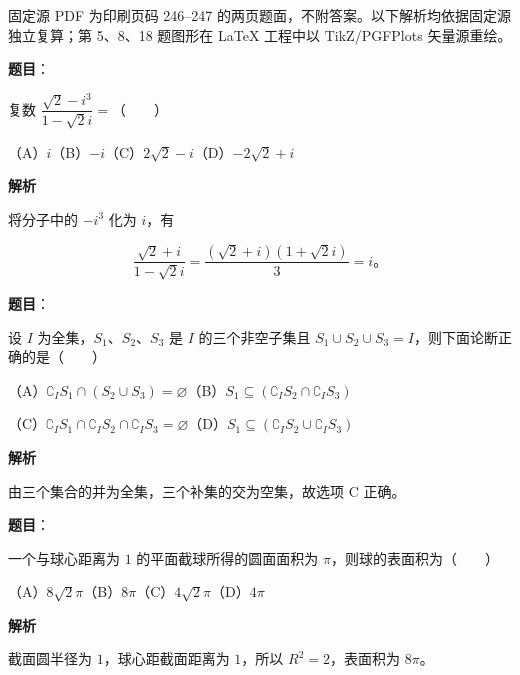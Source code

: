 

\begin{gktip}
固定源 PDF 为印刷页码 246–247 的两页题面，不附答案。以下解析均依据固定源独立复算；第 5、8、18 题图形在 LaTeX 工程中以 TikZ/PGFPlots 矢量源重绘。
\end{gktip}

\begin{answer}

\textbf{题目}：

复数 $\dfrac{\sqrt2-i^3}{1-\sqrt2i}=$\mbox{（　　）}

（A）$i$\quad（B）$-i$\quad（C）$2\sqrt2-i$\quad（D）$-2\sqrt2+i$

\textbf{解析}

将分子中的 $-i^3$ 化为 $i$，有

\nopagebreak[4]
\[
\frac{\sqrt2+i}{1-\sqrt2i}
=\frac{(\sqrt2+i)(1+\sqrt2i)}3=i\text{。}
\]


\end{answer}
\begin{answer}

\textbf{题目}：

设 $I$ 为全集，$S_1\text{、}S_2\text{、}S_3$ 是 $I$ 的三个非空子集且 $S_1\cup S_2\cup S_3=I$，则下面论断正确的是\mbox{（　　）}

（A）$\complement_I S_1\cap(S_2\cup S_3)=\varnothing$\quad（B）$S_1\subseteq(\complement_I S_2\cap\complement_I S_3)$

（C）$\complement_I S_1\cap\complement_I S_2\cap\complement_I S_3=\varnothing$\quad（D）$S_1\subseteq(\complement_I S_2\cup\complement_I S_3)$

\textbf{解析}

由三个集合的并为全集，三个补集的交为空集，故选项 C 正确。


\end{answer}
\begin{answer}

\textbf{题目}：

一个与球心距离为 $1$ 的平面截球所得的圆面面积为 $\pi$，则球的表面积为\mbox{（　　）}

（A）$8\sqrt2\pi$\quad（B）$8\pi$\quad（C）$4\sqrt2\pi$\quad（D）$4\pi$

\textbf{解析}

截面圆半径为 $1$，球心距截面距离为 $1$，所以 $R^2=2$，表面积为 $8\pi$。


\end{answer}
